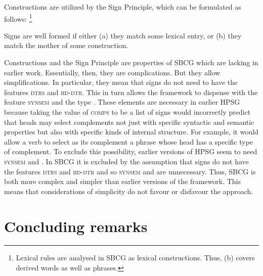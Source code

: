 \documentclass[output=paper
	        ,collection
	        ,collectionchapter
 	        ,biblatex
                ,babelshorthands
                ,newtxmath
                ,draftmode
                ,colorlinks, citecolor=brown
]{langscibook}
\begin{document}
\eal\label{ex:prop48}
\ex\label{ex:prop48a}\label{ex-constructions}
	
	
\ex\label{ex:prop48b}\label{ex-headed-constructions}
\zl

Constructions are utilized by the Sign Principle, which can be formulated as follows:%
%
\footnote{Lexical rules are analysed in SBCG as lexical constructions. Thus, (b) covers derived words as well as phrases.}
%

\ea\label{ex:prop49}
Signs are well formed if either (a) they match some lexical entry, or (b) they match the mother of some construction.
\z

Constructions and the Sign Principle are properties of SBCG which are lacking in earlier work. Essentially, then, they are complications. But they allow simplifications. In particular, they mean that signs do not need to have the features \textsc{dtrs} and \textsc{hd-dtr}. This in turn allows the framework to dispense with the feature \textsc{synsem} and the type . These elements are necessary in earlier HPSG because taking the value of \textsc{comps} to be a list of signs would incorrectly predict that heads may select complements not just with specific syntactic and semantic properties but also with specific kinds of internal structure. For example, it would allow a verb to select as its complement a phrase whose head has a specific type of complement. To exclude this possibility, earlier versions of HPSG seem to need \textsc{synsem} and  . In SBCG it is excluded by the assumption that signs do not have the features \textsc{dtrs} and \textsc{hd-dtr} and so \textsc{synsem} and  are unnecessary. Thus, SBCG is both more complex and simpler than earlier versions of the framework. This means that considerations of simplicity do not favour or disfavour the approach.

\section{Concluding remarks}\label{sec:prop8}
\end{document}
